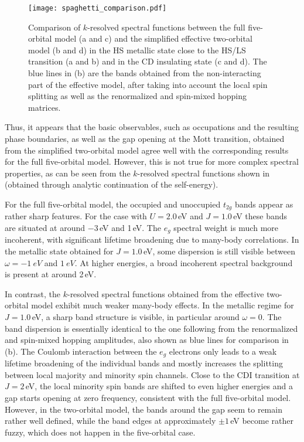 \documentclass[aps,prb,twocolumn,superscriptaddress,10pt]{revtex4-1}
\newcommand{\pref}[1]{\prettyref{#1}}%
\begin{document}
\begin{figure*}
    \centering
    \texttt{[image: spaghetti\_comparison.pdf]}
    \caption{Comparison of $k$-resolved spectral functions between the full five-orbital model (a and c) and the simplified effective two-orbital model (b and d) in the HS metallic state close to the HS/LS transition (a and b) and in the CD insulating state (c and d). The blue lines in (b) are the bands obtained from the non-interacting part of the effective model, after taking into account the local spin splitting as well as the renormalized and spin-mixed hopping matrices.}
    \label{fig:spagh_comp}
\end{figure*}

Thus, it appears that the basic observables, such as occupations and the resulting phase boundaries, as well as the gap opening at the Mott transition, obtained from the simplified two-orbital model agree well with the corresponding results for the full five-orbital model. However, this is not true for more complex spectral properties, as can be seen from the $k$-resolved spectral functions shown in \pref{fig:spagh_comp} (obtained through analytic continuation of the self-energy).

For the full five-orbital model, the occupied and unoccupied $t_{2g}$ bands appear as rather sharp features. For the case with $U=2.0$\,eV and $J=1.0$\,eV these bands are situated at around $-$3\,eV and 1\,eV.  
%
The $e_g$ spectral weight is much more incoherent, with significant lifetime broadening due to many-body correlations. In the metallic state obtained for $J=1.0$\,eV, some dispersion is still visible between $\omega = \SI{-1}{eV}$ and $\SI{1}{eV}$. At higher energies, a broad incoherent spectral background is present at around 2\,eV.

In contrast, the $k$-resolved spectral functions obtained from the effective two-orbital model exhibit much weaker many-body effects. In the metallic regime for $J=1.0$\,eV, a sharp band structure is visible, in particular around $\omega=0$. The band dispersion is essentially identical to the one following from the renormalized and spin-mixed hopping amplitudes, also shown as blue lines for comparison in \pref{fig:spagh_comp}(b). The Coulomb interaction between the $e_g$ electrons only leads to a weak lifetime broadening of the individual bands and mostly increases the splitting between local majority and minority spin channels. 
%
Close to the CDI transition  at $J=2$\,eV, the local minority spin bands are shifted to even higher energies and a gap starts opening at zero frequency, consistent with the full five-orbital model. However, in the two-orbital model, the bands around the gap seem to remain rather well defined, while the band edges at approximately $\pm 1$\,eV become rather fuzzy, which does not happen in the five-orbital case.
\end{document}

